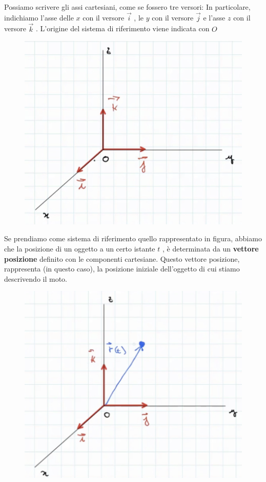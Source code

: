 Possiamo scrivere gli assi cartesiani, come se fossero tre versori: In particolare, indichiamo l'asse delle $ x $ con il versore $ \overrightarrow{i} $ , le $ y $ con il versore $ \overrightarrow{j} $ e l'asse $ z $ con il versore $ \overrightarrow{k} $ .
L'origine del sistema di riferimento viene indicata con $ O $

\begin{figure}[h]
\begin{center}
\includegraphics[width = 0.5 \textwidth]{lezione2/images/sistema riferimento2}
\label{fig:riferimento2}
\end{center}
\end{figure}

Se prendiamo come sistema di riferimento quello rappresentato in figura, abbiamo che la posizione di un oggetto a un certo istante $ t $ , è determinata da un \textbf{vettore posizione} definito con le componenti cartesiane. 
\newpage
Questo vettore posizione, rappresenta (in questo caso), la posizione iniziale dell'oggetto di cui stiamo descrivendo il moto. 

\begin{figure}[h]
\begin{center}
\includegraphics[width = 0.5 \textwidth]{lezione2/images/sistema riferimento3}
\label{fig:riferimento3}
\end{center}
\end{figure}

